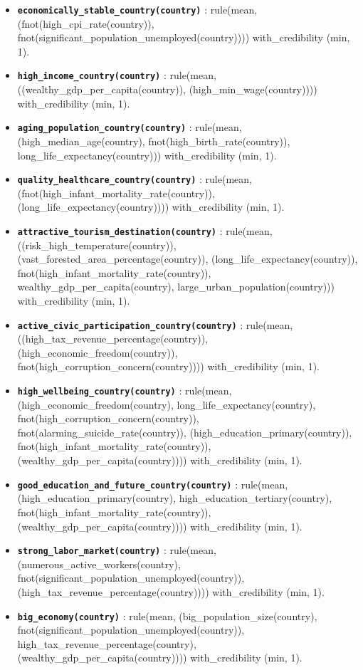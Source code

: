 \documentclass[fleqn,11pt]{article}
\begin{document}
\begin{itemize}
    \item \texttt{\textbf{economically\_stable\_country(country)}} : rule(mean, (fnot(high\_cpi\_rate(country)), fnot(significant\_population\_unemployed(country)))) with\_credibility (min, 1).
    \item \texttt{\textbf{high\_income\_country(country)}} : rule(mean, ((wealthy\_gdp\_per\_capita(country)), (high\_min\_wage(country)))) with\_credibility (min, 1).
    \item \texttt{\textbf{aging\_population\_country(country)}} : rule(mean, (high\_median\_age(country), fnot(high\_birth\_rate(country)), long\_life\_expectancy(country))) with\_credibility (min, 1).
    \item \texttt{\textbf{quality\_healthcare\_country(country)}} : rule(mean, (fnot(high\_infant\_mortality\_rate(country)), (long\_life\_expectancy(country)))) with\_credibility (min, 1).
    \item \texttt{\textbf{attractive\_tourism\_destination(country)}} : rule(mean, ((risk\_high\_temperature(country)), (vast\_forested\_area\_percentage(country)), (long\_life\_expectancy(country)), fnot(high\_infant\_mortality\_rate(country)), wealthy\_gdp\_per\_capita(country), large\_urban\_population(country))) with\_credibility (min, 1).
    \item \texttt{\textbf{active\_civic\_participation\_country(country)}} : rule(mean, ((high\_tax\_revenue\_percentage(country)), (high\_economic\_freedom(country)), fnot(high\_corruption\_concern(country)))) with\_credibility (min, 1).
    \item \texttt{\textbf{high\_wellbeing\_country(country)}} : rule(mean, (high\_economic\_freedom(country), long\_life\_expectancy(country), fnot(high\_corruption\_concern(country)), fnot(alarming\_suicide\_rate(country)), (high\_education\_primary(country)), fnot(high\_infant\_mortality\_rate(country)), (wealthy\_gdp\_per\_capita(country)))) with\_credibility (min, 1).
    \item \texttt{\textbf{good\_education\_and\_future\_country(country)}} : rule(mean, (high\_education\_primary(country), high\_education\_tertiary(country), fnot(high\_infant\_mortality\_rate(country)), (wealthy\_gdp\_per\_capita(country)))) with\_credibility (min, 1).
    \item \texttt{\textbf{strong\_labor\_market(country)}} : rule(mean, (numerous\_active\_workers(country), fnot(significant\_population\_unemployed(country)), (high\_tax\_revenue\_percentage(country)))) with\_credibility (min, 1).
    \item \texttt{\textbf{big\_economy(country)}} : rule(mean, (big\_population\_size(country), fnot(significant\_population\_unemployed(country)), high\_tax\_revenue\_percentage(country), (wealthy\_gdp\_per\_capita(country)))) with\_credibility (min, 1).
\end{itemize}
\end{document}
